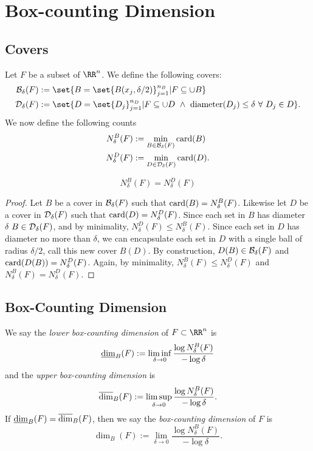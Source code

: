 
\chapter{Box-counting Dimension}

\section{Covers}

Let $F$ be a subset of $\RR^n$.
We define the following covers:
\begin{align*}
	\mcb_\delta(F)&:=\set{B=\set{B(x_j,\delta/2)}_{j=1}^{n_B}| F\subseteq \cup B}\\
	\mcd_\delta(F)&:=\set{D=\set{D_j}_{j=1}^{n_D}| F\subseteq \cup D \,\,\wedge\,\, \diam(D_j)\leq\delta\,\, \forall\,\, D_j\in D}.
\end{align*}
We now define the following counts
\begin{align*}
	N^B_\delta(F)&:=\min\limits_{B\in\mathcal{B}_\delta(F)}\operatorname{card}(B)\\
	N^D_\delta(F)&:=\min\limits_{D\in\mathcal{D}_\delta(F)}\operatorname{card}(D).
\end{align*}

\begin{thm}
	\[
		N^B_\delta(F)=N^D_\delta(F)
	\]
\end{thm}
\begin{proof}
	Let $B$ be a cover in $\mathcal{B}_\delta(F)$ such that $\operatorname{card}(B)=N^B_\delta(F)$.
	Likewise let $D$ be a cover in $\mathcal{D}_\delta(F)$ such that $\operatorname{card}(D)=N^D_\delta(F)$.
	Since each set in $B$ has diameter $\delta$ $B\in\mathcal{D}_\delta(F)$, and by minimality, $N^D_\delta(F)\leq N^B_\delta(F)$.
	Since each set in $D$ has diameter no more than $\delta$, we can encapsulate each set in $D$ with a single ball of radius $\delta/2$, call this new cover $B(D)$.
	By construction, $D(B)\in\mathcal{B}_\delta(F)$ and $\operatorname{card}(D(B))=N^D_\delta(F)$.
	Again, by minimality, $N^B_\delta(F)\leq N^D_\delta(F)$ and $N^B_\delta(F) = N^D_\delta(F)$.
\end{proof}

\section{Box-Counting Dimension}

\begin{definition}
	We say the \textit{lower box-counting dimension} of $F\subset\RR^n$ is
	\[
		\underline{\operatorname{dim}}_B(F):=\liminf\limits_{\delta\rightarrow 0} \frac{\log N^B_\delta(F)}{-\log\delta}
	\]
	and the \textit{upper box-counting dimension} is
	\[
		\overline{\operatorname{dim}}_B(F):=\limsup\limits_{\delta\rightarrow 0} \frac{\log N^B_\delta(F)}{-\log\delta}.
	\]
	If $\underline{\operatorname{dim}}_B(F)=\overline{\operatorname{dim}}_B(F)$, then we say the \textit{box-counting dimension} of $F$ is
	\[
		\dim_B(F):=\lim\limits_{\delta\rightarrow 0} \frac{\log N^B_\delta(F)}{-\log\delta}.
	\]
\end{definition}

